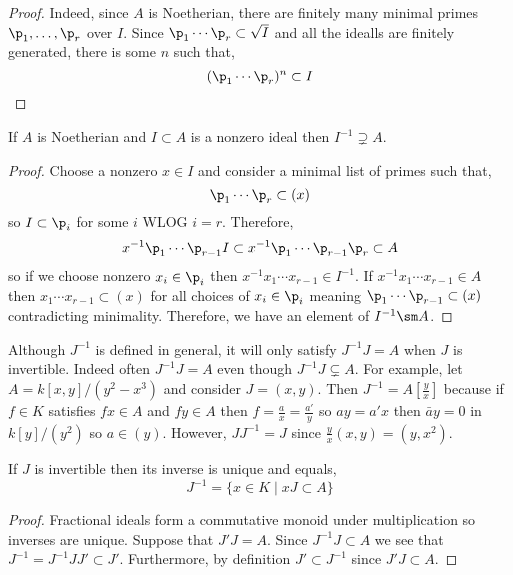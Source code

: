 \documentclass[12pt]{article}
\begin{document}
\begin{proof}
Indeed, since $A$ is Noetherian, there are finitely many minimal primes $\p_1, \dots, \p_r$ over $I$. Since $\p_1 \cdots \p_r \subset \sqrt{I}$ and all the idealls are finitely generated, there is some $n$ such that,
\[ (\p_1 \cdots \p_r)^n \subset I \]
\end{proof}

\begin{prop}
If $A$ is Noetherian and $I \subset A$ is a nonzero ideal then $I^{-1} \supsetneq A$.
\end{prop}

\begin{proof}
Choose a nonzero $x \in I$ and consider a minimal list of primes such that,
\[ \p_1 \cdots \p_r \subset (x) \]
so $I \subset \p_i$ for some $i$ WLOG $i = r$. Therefore,
\[ x^{-1} \p_1 \cdots \p_{r-1} I \subset x^{-1} \p_1 \cdots\p_{r-1} \p_r \subset A \]
so if we choose nonzero $x_i \in \p_i$ then $x^{-1} x_1 \cdots x_{r-1} \in I^{-1}$. If $x^{-1} x_1 \cdots x_{r-1} \in A$ then $x_1 \cdots x_{r-1} \subset (x)$ for all choices of $x_i \in \p_i$ meaning $\p_1 \cdots \p_{r-1} \subset (x)$ contradicting minimality. Therefore, we have an element of $I^{-1} \sm A$. 
\end{proof}

\begin{rmk}
Although $J^{-1}$ is defined in general, it will only satisfy $J^{-1} J = A$ when $J$ is invertible. Indeed often $J^{-1} J = A$ even though $J^{-1} J \subsetneq A$. For example, let $A = k[x,y]/(y^2 - x^3)$ and consider $J = (x,y)$. Then $J^{-1} = A[\frac{y}{x}]$ because if $f \in K$ satisfies $f x \in A$ and $f y \in A$ then $f = \frac{a}{x} = \frac{a'}{y}$ so $a y = a' x$ then $\bar{a} y = 0$ in $k[y]/(y^2)$ so $a \in (y)$. However, $J J^{-1} = J$ since $\frac{y}{x} (x,y) = (y, x^2)$.
\end{rmk}

\begin{prop}
If $J$ is invertible then its inverse is unique and equals,
\[ J^{-1} = \{ x \in K \mid x J \subset A \} \]
\end{prop}

\begin{proof}
Fractional ideals form a commutative monoid under multiplication so inverses are unique. Suppose that $J' J = A$. Since $J^{-1} J \subset A$ we see that $J^{-1} = J^{-1} J J' \subset J'$. Furthermore, by definition $J' \subset J^{-1}$ since $J' J \subset A$. 
\end{proof}
\end{document}
